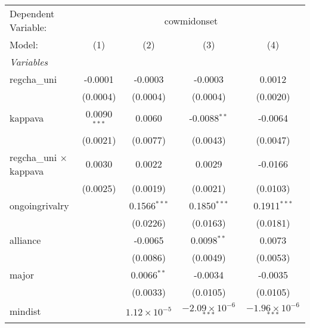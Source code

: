 
\begingroup
\centering
\begin{tabular}{lcccc}
   \tabularnewline \midrule \midrule
   Dependent Variable: & \multicolumn{4}{c}{cowmidonset}\\
   Model:                                & (1)            & (2)                     & (3)                            & (4)\\  
   \midrule
   \emph{Variables}\\
   regcha\_uni                           & -0.0001        & -0.0003                 & -0.0003                        & 0.0012\\   
                                         & (0.0004)       & (0.0004)                & (0.0004)                       & (0.0020)\\   
   kappava                               & 0.0090$^{***}$ & 0.0060                  & -0.0088$^{**}$                 & -0.0064\\   
                                         & (0.0021)       & (0.0077)                & (0.0043)                       & (0.0047)\\   
   regcha\_uni $\times$ kappava          & 0.0030         & 0.0022                  & 0.0029                         & -0.0166\\   
                                         & (0.0025)       & (0.0019)                & (0.0021)                       & (0.0103)\\   
   ongoingrivalry                        &                & 0.1566$^{***}$          & 0.1850$^{***}$                 & 0.1911$^{***}$\\   
                                         &                & (0.0226)                & (0.0163)                       & (0.0181)\\   
   alliance                              &                & -0.0065                 & 0.0098$^{**}$                  & 0.0073\\   
                                         &                & (0.0086)                & (0.0049)                       & (0.0053)\\   
   major                                 &                & 0.0066$^{**}$           & -0.0034                        & -0.0035\\   
                                         &                & (0.0033)                & (0.0105)                       & (0.0105)\\   
   mindist                               &                & $1.12\times 10^{-5}$    & $-2.09\times 10^{-6}$$^{***}$  & $-1.96\times 10^{-6}$$^{***}$\\    

\end{tabular}
